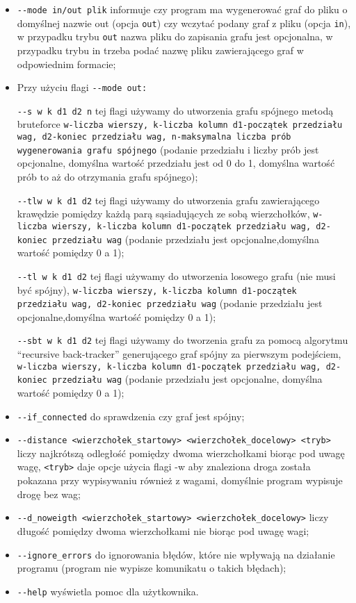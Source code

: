 \documentclass[]{article}
\begin{document}
\begin{itemize}
\item
  \texttt{-\/-mode\ in/out\ plik} informuje czy program ma wygenerować graf do pliku o domyślnej nazwie out (opcja \texttt{out}) czy wczytać podany graf z pliku (opcja \texttt{in}), w przypadku trybu \texttt{out} nazwa pliku do zapisania grafu jest opcjonalna, w przypadku trybu in trzeba podać nazwę pliku zawierającego graf w odpowiednim formacie;

\item
  Przy użyciu flagi \texttt{-\/-mode\ out:}

\texttt{-\/-s w k d1 d2 n} tej flagi używamy do utworzenia grafu spójnego metodą bruteforce \texttt{w-liczba wierszy, k-liczba kolumn d1-początek przedziału wag, d2-koniec przedziału wag, n-maksymalna liczba prób wygenerowania grafu spójnego} (podanie przedziału i liczby prób jest opcjonalne, domyślna wartość przedziału jest od 0 do 1, domyślna wartość prób to aż do otrzymania grafu spójnego);


\texttt{-\/-tlw w k d1 d2} tej flagi używamy do utworzenia grafu zawierającego krawędzie pomiędzy każdą parą sąsiadujących ze sobą wierzchołków, \texttt{w-liczba wierszy, k-liczba kolumn d1-początek przedziału wag, d2-koniec przedziału wag} (podanie przedziału jest opcjonalne,domyślna wartość pomiędzy 0 a 1);


\texttt{-\/-tl w k d1 d2} tej flagi używamy do utworzenia losowego grafu (nie musi być spójny), \texttt{w-liczba wierszy, k-liczba kolumn d1-początek przedziału wag, d2-koniec przedziału wag} (podanie przedziału jest opcjonalne,domyślna wartość pomiędzy 0 a 1);

\texttt{-\/-sbt w k d1 d2} tej flagi używamy do tworzenia grafu za pomocą algorytmu “recursive back-tracker” generującego graf spójny za pierwszym podejściem, \texttt{w-liczba wierszy, k-liczba kolumn d1-początek przedziału wag, d2-koniec przedziału wag} (podanie przedziału jest opcjonalne, domyślna wartość pomiędzy 0 a 1);

\item
\texttt{-\/-if\_connected}  do sprawdzenia czy graf jest spójny;
\item
\texttt{-\/-distance\ <wierzchołek\_startowy>\ <wierzchołek\_docelowy>\ <tryb>} liczy najkrótszą odległość pomiędzy dwoma wierzchołkami biorąc pod uwagę wagę, \texttt{<tryb>} daje opcje użycia flagi -w aby znaleziona droga została pokazana przy wypisywaniu również z wagami, domyślnie program wypisuje drogę bez wag;
\item
\texttt{-\/-d\_noweigth\ <wierzchołek\_startowy> <wierzchołek\_docelowy>} liczy długość pomiędzy dwoma wierzchołkami nie biorąc pod uwagę wagi;
\item
\texttt{-\/-ignore\_errors} do ignorowania błędów, które nie wpływają na działanie programu (program nie wypisze komunikatu o takich błędach);
\item
\texttt{-\/-help} wyświetla pomoc dla użytkownika.





\end{itemize}
\end{document}
